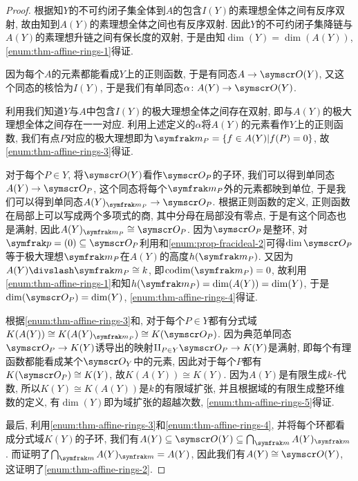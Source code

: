 \begin{proof}
  根据知$Y$的不可约闭子集全体到$A$的包含$I(Y)$的素理想全体之间有反序双射, 故由知到$A(Y)$的素理想全体之间也有反序双射. 因此$Y$的不可约闭子集降链与$A(Y)$的素理想升链之间有保长度的双射, 于是由知$\dim (Y)=\dim (A(Y))$, \ref{enum:thm-affine-rings-1}得证.

  因为每个$A$的元素都能看成$Y$上的正则函数, 于是有同态$A\to \OO (Y)$, 又这个同态的核恰为$I(Y)$, 于是我们有单同态$\alpha\colon A(Y)\to \OO (Y)$.

  利用我们知道$Y$与$A$中包含$I(Y)$的极大理想全体之间存在双射, 即与$A(Y)$的极大理想全体之间存在一一对应. 利用上述定义的$\alpha$将$A(Y)$的元素看作$Y$上的正则函数, 我们有点$P$对应的极大理想即为$\ideal{m}_{P}=\{f\in A(Y)\vert f(P)=0\}$, 故\ref{enum:thm-affine-rings-3}得证.

  对于每个$P\in Y$, 将$\OO (Y)$看作$\OO_P$的子环, 我们可以得到单同态$A(Y)\to \OO_P$, 这个同态将每个$\ideal{m}_P$外的元素都映到单位, 于是我们可以得到单同态$A(Y)_{\ideal{m}_{P}}\to \OO_P$. 根据正则函数的定义, 正则函数在局部上可以写成两个多项式的商, 其中分母在局部没有零点, 于是有这个同态也是满射, 因此$A(Y)_{\ideal{m}_P}\cong \OO_P$. 因为$\OO_P$是整环, 对$\ideal{p}=(0)\subseteq \OO_P$利用和\ref{enum:prop-fracideal-2}可得$\dim \OO_P$等于极大理想$\ideal{m}_P$在$A(Y)$的高度$h(\ideal{m}_P)$. 又因为$A(Y){\divslash}\ideal{m}_P\cong \kk$, 即$\codim (\ideal{m}_P)=0$, 故利用\ref{enum:thm-affine-rings-1}和知$h(\ideal{m}_P)=\dim (A(Y))=\dim (Y)$, 于是$\dim (\OO_P)=\dim (Y)$, \ref{enum:thm-affine-rings-4}得证.

  根据\ref{enum:thm-affine-rings-3}和, 对于每个$P\in Y$都有分式域$K(A(Y))\cong K(A(Y)_{\ideal{m}_P})\cong K(\OO_P)$. 因为典范单同态$\OO_P\to K(Y)$诱导出的映射$\amalg_{P\in Y}\OO_P\to K(Y)$是满射, 即每个有理函数都能看成某个$\OO_Y$中的元素, 因此对于每个$P$都有$K(\OO_P)\cong K(Y)$, 故$K(A(Y))\cong K(Y)$. 因为$A(Y)$是有限生成$k$-代数, 所以$K(Y)\cong K(A(Y))$是$k$的有限域扩张, 并且根据域的有限生成整环维数的定义, 有$\dim (Y)$即为域扩张的超越次数, \ref{enum:thm-affine-rings-5}得证.

  最后, 利用\ref{enum:thm-affine-rings-3}和\ref{enum:thm-affine-rings-4}, 并将每个环都看成分式域$K(Y)$的子环, 我们有$A(Y)\subseteq\OO (Y)\subseteq \bigcap_{\ideal{m}} A(Y)_{\ideal{m}}$. 而证明了$\bigcap_{\ideal{m}} A(Y)_{\ideal{m}}= A(Y)$, 因此我们有$A(Y)\cong \OO(Y)$, 这证明了\ref{enum:thm-affine-rings-2}.
\end{proof}

